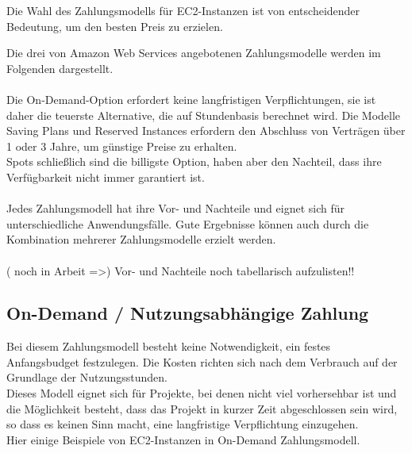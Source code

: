 Die Wahl des Zahlungsmodells für EC2-Instanzen ist von entscheidender Bedeutung, um den besten Preis zu erzielen.

Die drei von Amazon Web Services angebotenen Zahlungsmodelle werden im Folgenden dargestellt.
\\\\
Die On-Demand-Option erfordert keine langfristigen Verpflichtungen, sie ist daher die teuerste Alternative, die auf Stundenbasis berechnet wird. Die Modelle Saving Plans und Reserved Instances erfordern den Abschluss von Verträgen über 1 oder 3 Jahre, um günstige Preise zu erhalten.
\\
Spots schließlich sind die billigste Option, haben aber den Nachteil, dass ihre Verfügbarkeit nicht immer garantiert ist.
\\\\
Jedes Zahlungsmodell hat ihre Vor- und Nachteile und eignet sich für unterschiedliche Anwendungsfälle. Gute Ergebnisse können auch durch die Kombination mehrerer Zahlungsmodelle erzielt werden.
\\\\
( noch in Arbeit =>)
Vor- und Nachteile noch tabellarisch aufzulisten!!


\subsection{On-Demand / Nutzungsabhängige Zahlung}
Bei diesem Zahlungsmodell besteht keine Notwendigkeit, ein festes Anfangsbudget festzulegen. Die Kosten richten sich nach dem Verbrauch auf der Grundlage der Nutzungsstunden.
\\
Dieses Modell eignet sich für Projekte, bei denen nicht viel vorhersehbar ist und die Möglichkeit besteht, dass das Projekt in kurzer Zeit abgeschlossen sein wird, so dass es keinen Sinn macht, eine langfristige Verpflichtung einzugehen.
\\
Hier einige Beispiele von EC2-Instanzen in On-Demand Zahlungsmodell.

